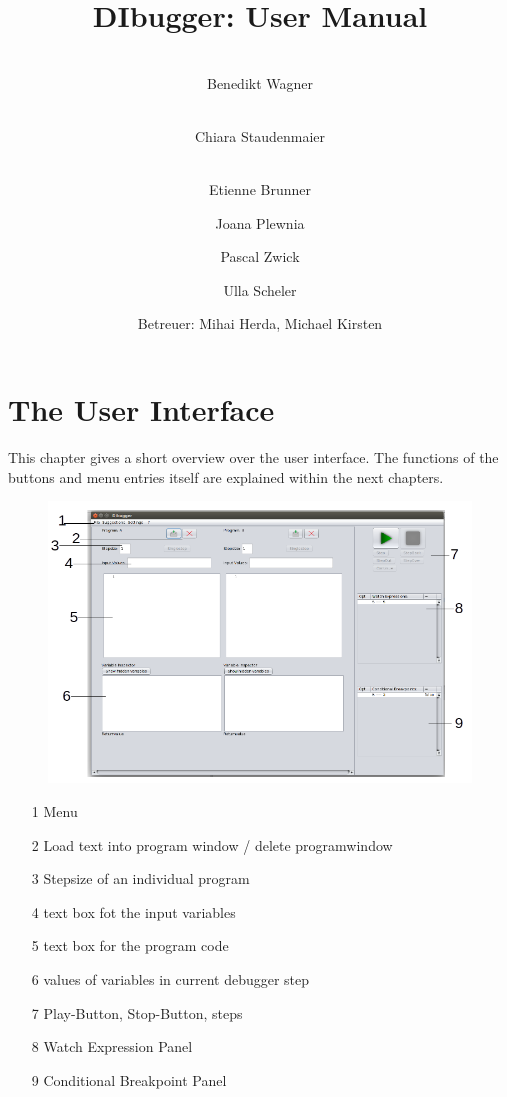 \documentclass[parskip=full]{memoir}
\title{
	\vspace{2cm}
	\myfont 
	DIbugger: User Manual\\
}
\author{
	\vspace{1cm} \\
	Benedikt Wagner\\
	\and
	\vspace{1cm} \\ Chiara Staudenmaier\\
	\and 
		\vspace{1cm} \\
		Etienne Brunner\\
	\and Joana Plewnia\\
	\and Pascal Zwick\\
	\and Ulla Scheler\\
	\vspace{1cm}
	\and Betreuer: Mihai Herda, Michael Kirsten
	\vspace{4cm}
}
\begin{document}
\clearpage
\maketitle
{}
\newpage

\tableofcontents
{}

\chapter{The User Interface} %
This chapter gives a short overview over the user interface. The functions of the buttons and menu entries itself are explained within the next chapters.

\begin{figure}[t]

\includegraphics[width=1.0\textwidth]{../Iplementierung/document_data/guiOverview.png}

\end{figure}

\begin{itemize}
\item[1] Menu
\item[2] Load text into program window / delete programwindow
\item[3] Stepsize of an individual program
\item[4] text box fot the input variables
\item[5] text box for the program code
\item[6] values of variables in current debugger step
\item[7] Play-Button, Stop-Button, steps
\item[8] Watch Expression Panel
\item[9] Conditional Breakpoint Panel
\end{itemize}
\end{document}
